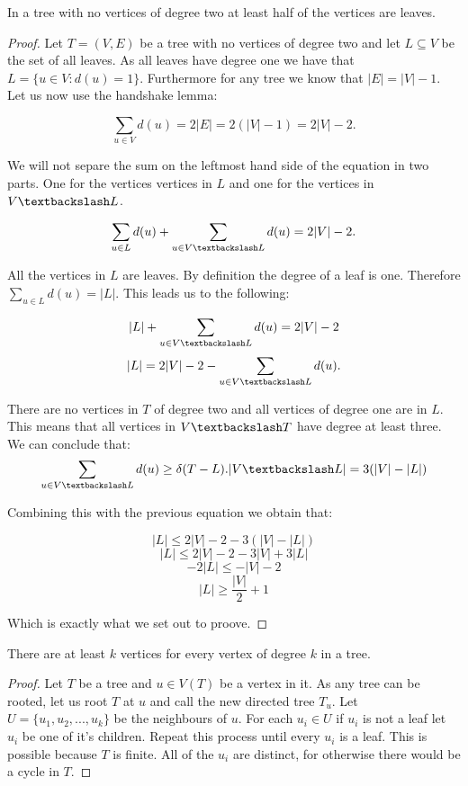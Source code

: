 \begin{lem} In a tree with no vertices of degree two at least half of the vertices are leaves. \end{lem}

\begin{proof}
    Let $T = (V, E)$ be a tree with no vertices of degree two and let $L \subseteq V$ be the set of all leaves. As all leaves have degree one we have that $L = \{u \in V: d(u) = 1\}$. Furthermore for any tree we know that $|E| = |V| - 1$. Let us now use the handshake lemma:

    $$ \sum_{u \in V}{d(u)} = 2|E| = 2(|V| - 1) = 2|V| - 2.$$

    We will not separe the sum on the leftmost hand side of the equation in two parts. One for the vertices vertices in $L$ and one for the vertices in $V\textbackslash L$.


    $$ \sum_{u \in L}{d(u)} + \sum_{u \in V\textbackslash L}{d(u)} = 2|V| - 2.$$

    All the vertices in $L$ are leaves. By definition the degree of a leaf is one. Therefore $\sum_{u \in L}{d(u)} = |L|$. This leads us to the following:

    $$  |L| + \sum_{u \in V\textbackslash L}{d(u)} = 2|V| - 2$$
    $$  |L|  = 2|V| - 2 - \sum_{u \in V\textbackslash L}{d(u)}.$$

    There are no vertices in $T$ of degree two and all vertices of degree one are in $L$. This means that all vertices in $V \textbackslash T$ have degree at least three. We can conclude that:
    $$\sum_{u \in V\textbackslash L}{d(u)} \ge \delta(T - L).|V\textbackslash L| = 3(|V| - |L|) $$

    Combining this with the previous equation we obtain that:

    $$  |L| \le 2|V| - 2 - 3(|V| - |L|)$$
    $$  |L| \le 2|V| - 2 - 3|V| + 3|L|$$
    $$  -2|L| \le -|V| - 2$$
    $$  |L| \ge \frac{|V|}{2} + 1$$

    Which is exactly what we set out to proove.


\end{proof}

\begin{lem} There are at least $k$ vertices for every vertex of degree $k$ in a tree. \end{lem}

\begin{proof}
    Let $T$ be a tree and $u \in V(T)$ be a vertex in it. As any tree can be rooted, let us root $T$ at $u$ and call the new directed tree $T_u$. Let $U = \{u_1, u_2, ..., u_k\}$ be the neighbours of $u$. For each $u_i \in U$ if $u_i$ is not a leaf let $u_i$ be one of it's children. Repeat this process until every $u_i$ is a leaf. This is possible because $T$ is finite. All of the $u_i$ are distinct, for otherwise there would be a cycle in $T$.
    
\end{proof}


